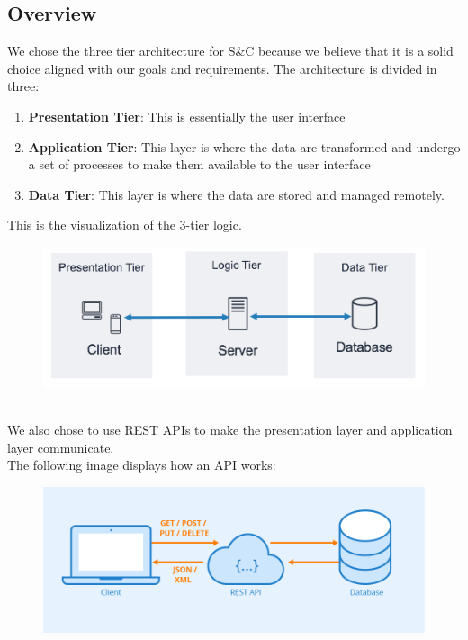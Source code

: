 \subsection{Overview}
We chose the three tier architecture for S\&C because we believe that it is a solid choice aligned with our goals and requirements.
The architecture is divided in three:
\begin{enumerate}
    \item\textbf{Presentation Tier}:
    This is essentially the user interface
    \item\textbf{Application Tier}:
    This layer is where the data are transformed and undergo a set of processes to make them available to the user interface
    \item\textbf{Data Tier}:
    This layer is where the data are stored and managed remotely.
\end{enumerate}
This is the visualization of the 3-tier logic. \cite{3Tier}\\
\begin{figure}[h!]
        \centering  \includegraphics[width=1\textwidth]{DD/Images/aws.png}
        \label{fig:3Tier}
\end{figure}
\\
We also chose to use REST APIs to make the presentation layer and application layer communicate.  \\
The following image displays how an API works\cite{REST}:
\begin{figure}[h!]
        \centering  \includegraphics[width=1\textwidth]{DD/Images/rest.png}
        \label{fig:RESTAPI}
\end{figure}
\newpage
